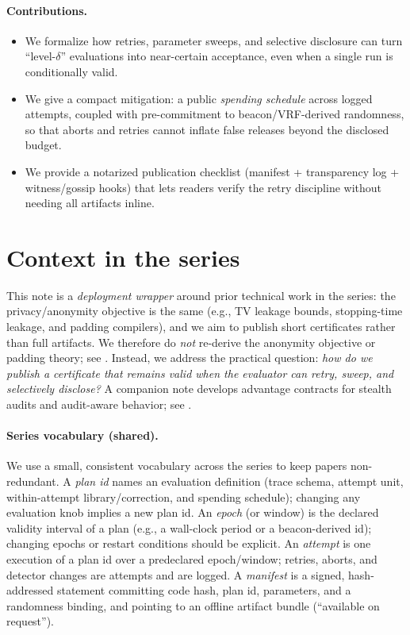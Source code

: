 \documentclass[11pt]{article}
\begin{document}
\paragraph{Contributions.}
\begin{itemize}
\item We formalize how retries, parameter sweeps, and selective disclosure can turn ``level-$\delta$'' evaluations into near-certain acceptance, even when a single run is conditionally valid.
\item We give a compact mitigation: a public \emph{spending schedule} across logged attempts, coupled with pre-commitment to beacon/VRF-derived randomness, so that aborts and retries cannot inflate false releases beyond the disclosed budget.
\item We provide a notarized publication checklist (manifest + transparency log + witness/gossip hooks) that lets readers verify the retry discipline without needing all artifacts inline.
\end{itemize}

\section{Context in the series}
This note is a \emph{deployment wrapper} around prior technical work in the series:
the privacy/anonymity objective is the same (e.g., TV leakage bounds, stopping-time leakage, and padding compilers),
and we aim to publish short certificates rather than full artifacts.
We therefore do \emph{not} re-derive the anonymity objective or padding theory; see
\cite{series:schedcompiler,series:spectral,series:knapsacktransport,series:manytestinglowerbounds}.
Instead, we address the practical question:
\emph{how do we publish a certificate that remains valid when the evaluator can retry, sweep, and selectively disclose?} A companion note develops advantage contracts for stealth audits and audit-aware behavior; see \cite{series:advantagecontracts}.

\paragraph{Series vocabulary (shared).}
We use a small, consistent vocabulary across the series to keep papers non-redundant.
A \emph{plan id} names an evaluation definition (trace schema, attempt unit, within-attempt library/correction, and spending schedule);
changing any evaluation knob implies a new plan id.
An \emph{epoch} (or window) is the declared validity interval of a plan (e.g., a wall-clock period or a beacon-derived id); changing epochs or restart conditions should be explicit.
An \emph{attempt} is one execution of a plan id over a predeclared epoch/window; retries, aborts, and detector changes are attempts and are logged.
A \emph{manifest} is a signed, hash-addressed statement committing code hash, plan id, parameters, and a randomness binding, and pointing to an offline artifact bundle (``available on request'').
\end{document}
